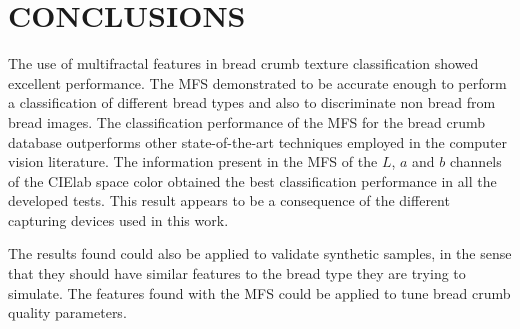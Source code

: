 \documentclass[a4paper,10pt]{article}
\begin{document}
\section{CONCLUSIONS}
The use of multifractal features in bread crumb texture classification showed excellent performance. The MFS demonstrated to be accurate enough to perform a classification of different bread types and also to discriminate non bread from bread images. The classification performance of the MFS for the bread crumb database outperforms other state-of-the-art techniques employed in the computer vision literature. The information present in the MFS of the $L$, $a$ and $b$ channels of the CIElab space color obtained the best classification performance in all the developed tests. This result appears to be a consequence of the different capturing devices used in this work.

The results found could also be applied to validate synthetic samples, in the sense that they should have similar features to the bread type they are trying to simulate. The features found with the MFS could be applied to tune bread crumb quality parameters.





\end{document}
